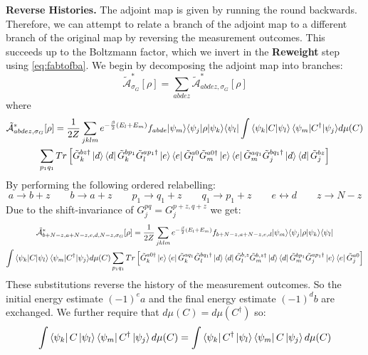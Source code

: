 \documentclass[aps,floatfix,10pt,amssymb,amsfont,amsmath,superscriptaddress,float,nofootinbib,longbibliography,nobalancelastpage,twocolumn]{revtex4-2}
\begin{document}
\textbf{Reverse Histories.} The adjoint map is given by running the round backwards. Therefore, we can attempt to relate a branch of the adjoint map to a different branch  of the original map by reversing the measurement outcomes. This succeeds up to the Boltzmann factor, which we invert in the \textbf{Reweight} step using \eqref{eq:fabtofba}. We begin by decomposing the adjoint map into branches:
\begin{equation}
    \tilde{\mathcal{A}}^*_{\sigma_G}[\rho] =  \sum_{abdez}\tilde{\mathcal{A}}^*_{abdez,\sigma_G}[\rho]
\end{equation}
where 
\begin{multline}
  \tilde{\mathcal{A}}^*_{abdez,\sigma_G}[\rho] = \frac{1}{2Z} \sum_{jklm}  e^{-\frac{\beta}{2}(E_l+E_m)}{f_{abde}} {\ket{\psi_m}}{\bra{\psi_j}}\rho{\ket{\psi_k}}{\bra{\psi_l}} \int {\braket{\psi_k|C|\psi_l}\braket{\psi_m|C^{\dagger}|\psi_j}} d\mu(C)\\\sum_{p_1q_1}Tr\left[ {\tilde G^{bz\dagger}_k\ket{d}\bra{d}\tilde G^{bp_1}_k} {\tilde G_l^{ap_1\dagger}\ket{e}\bra{e}\tilde G_l^{a0}\tilde G_m^{a0\dagger}\ket{e}\bra{e}\tilde G_m^{aq_1}} {\tilde G^{bq_1\dagger}_j\ket{d}\bra{d}\tilde G^{bz}_j } \right]
\end{multline}
By performing the following ordered relabelling:
\begin{equation}
    a \rightarrow b+z \qquad b\rightarrow a+z \qquad p_1 \rightarrow q_1+ z \qquad q_1 \rightarrow p_1 + z \qquad e \leftrightarrow d \qquad z \rightarrow N-z
\end{equation}
Due to the shift-invariance of $G^{pq}_j = G^{p+z,q+z}_j$ we get:
\begin{multline}
  \tilde{\mathcal{A}}^*_{b+N-z,a+N-z,e,d,N-z,\sigma_G}[\rho] = \frac{1}{2Z} \sum_{jklm}  e^{-\frac{\beta}{2}(E_l+E_m)}{f_{b+N-z,a+N-z,e,d}} {\ket{\psi_m}}{\bra{\psi_j}}\rho{\ket{\psi_k}}{\bra{\psi_l}} \\\int {\braket{\psi_k|C|\psi_l}\braket{\psi_m|C^{\dagger}|\psi_j}} d\mu(C)\sum_{p_1q_1} Tr\left[{\tilde G^{a0\dagger}_k\ket{e}\bra{e}\tilde G^{aq_1}_k} {\tilde G_l^{bq_1\dagger}\ket{d}\bra{d}\tilde G_l^{b,z}\tilde G_m^{b, z\dagger}\ket{d}\bra{d}\tilde G_m^{bp_1}} {\tilde G^{ap_1\dagger}_j\ket{e}\bra{e}\tilde G^{a0}_j } \right]
\end{multline}
These substitutions reverse the history of the measurement outcomes. So the initial energy estimate $(-1)^ea$ and the final energy estimate $(-1)^db$ are exchanged. We further require that $d\mu(C) = d\mu(C^{\dagger})$ so:
\begin{equation}
    \int  \bra{\psi_k}C\ket{\psi_{l}}\bra{\psi_m}C^{\dagger} \ket{\psi_j} d\mu(C) = \int  \bra{\psi_k}C^{\dagger}\ket{\psi_{l}}\bra{\psi_m}C \ket{\psi_j} d\mu(C)
\end{equation}
\end{document}
